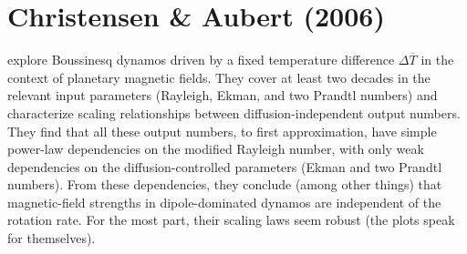 \documentclass[12pt]{article} %
\begin{document}
\section{Christensen \& Aubert (2006)}
\citet{Christensen2006} explore Boussinesq dynamos driven by a fixed temperature difference $\Delta\overline{T}$ in the context of planetary magnetic fields. They cover at least two decades in the relevant input parameters (Rayleigh, Ekman, and two Prandtl numbers) and characterize scaling relationships between diffusion-independent output numbers. They find that all these output numbers, to first approximation, have simple power-law dependencies on the modified Rayleigh number, with only weak dependencies on the diffusion-controlled parameters (Ekman and two Prandtl numbers). From these dependencies, they conclude (among other things) that magnetic-field strengths in dipole-dominated dynamos are independent of the rotation rate. For the most part, their scaling laws seem robust (the plots speak for themselves). 
\end{document}
